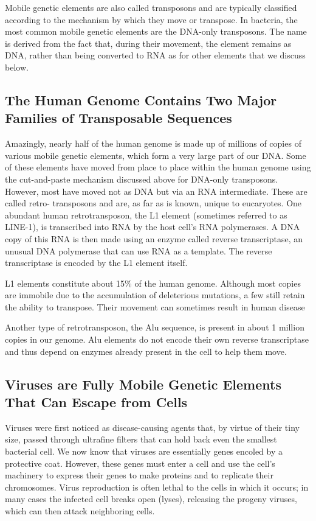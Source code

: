 Mobile genetic elements are also called transposons and are typically
classified according to the mechanism by which they move or transpose.
In bacteria, the most common mobile genetic elements are the DNA-only
transposons. The name is derived from the fact that, during their movement,
the element remains as DNA, rather than being converted to RNA as
for other elements that we discuss below.

\subsection{The Human Genome Contains Two Major Families of Transposable Sequences}

Amazingly, nearly half of the human genome is made up of millions of
copies of various mobile genetic elements, which form a very large part
of our DNA. Some of these elements have moved from place to place
within the human genome using the cut-and-paste mechanism discussed
above for DNA-only transposons. However, most have
moved not as DNA but via an RNA intermediate. These are called retro-
transposons and are, as far as is known, unique to eucaryotes.
One abundant human retrotransposon, the L1 element (sometimes referred
to as LINE-1), is transcribed into RNA by the host cell’s RNA polymerases.
A DNA copy of this RNA is then made using an enzyme called reverse
transcriptase, an unusual DNA polymerase that can use RNA as a template.
The reverse transcriptase is encoded by the L1 element itself.

L1 elements constitute about 15\% of the human genome. Although most
copies are immobile due to the accumulation of deleterious mutations, a
few still retain the ability to transpose. Their movement can sometimes
result in human disease

Another type of retrotransposon, the Alu sequence, is present in about
1 million copies in our genome. Alu elements do not encode their own
reverse transcriptase and thus depend on enzymes already present in the
cell to help them move.

\subsection{Viruses are Fully Mobile Genetic Elements That Can Escape from Cells}

Viruses were first noticed as disease-causing agents that, by virtue of
their tiny size, passed through ultrafine filters that can hold back even the
smallest bacterial cell. We now know that viruses are essentially genes
encoled by a protective coat.
However, these genes must enter a
cell and use the cell’s machinery to express their genes to make proteins
and to replicate their chromosomes. Virus reproduction is often lethal to
the cells in which it occurs; in many cases the infected cell breaks open
(lyses), releasing the progeny viruses, which can then attack neighboring
cells.

